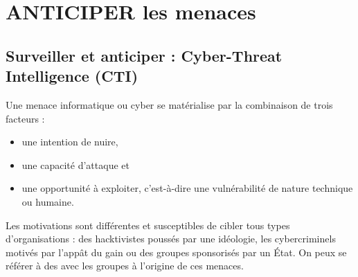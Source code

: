 
\section{ANTICIPER  les menaces}

\subsection{Surveiller et anticiper : Cyber-Threat Intelligence (CTI)}

Une menace informatique ou cyber se matérialise par la combinaison de trois facteurs : 

\begin{itemize}
  \item une intention de nuire, 
  \item une capacité d’attaque et 
  \item une opportunité à exploiter, c’est-à-dire une vulnérabilité de nature technique ou humaine. 
\end{itemize}


Les motivations sont différentes et susceptibles de cibler tous types d’organisations : des hacktivistes poussés par une idéologie, les cybercriminels motivés par l’appât du gain ou  des groupes sponsorisés par un État. On peux se référer à des  avec les groupes à l'origine de ces menaces.




